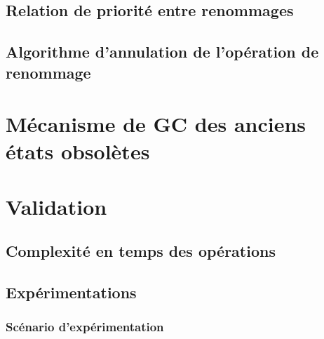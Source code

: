 \subsection{Relation de priorité entre renommages}


\subsection{Algorithme d'annulation de l'opération de renommage}


% 

\section{Mécanisme de \acl{GC} des anciens états obsolètes}


\section{Validation}


\subsection{Complexité en temps des opérations}


\subsection{Expérimentations}


\subsubsection{Scénario d'expérimentation}


